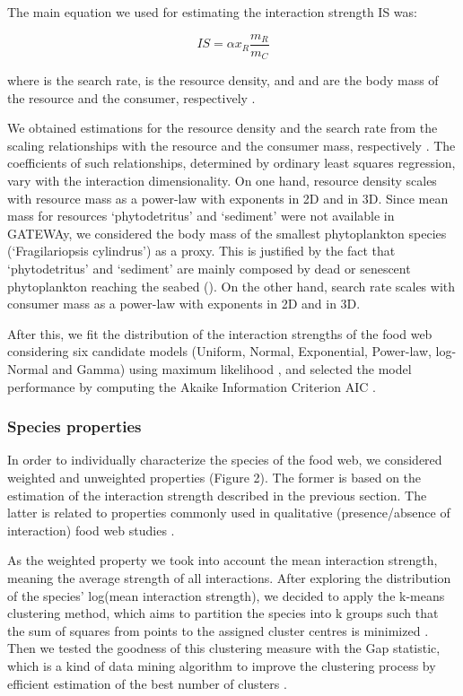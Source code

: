 \documentclass[gc, manuscript]{copernicus}
\begin{document}
The main equation we used for estimating the interaction strength IS
was:

\begin{equation}
IS = \alpha x_R \frac{m_R}{m_C}
\end{equation}

where \vec{\alpha} is the search rate,  is the resource
density, and  and  are the body mass of the resource
and the consumer, respectively \citep{Pawar2012}.

We obtained estimations for the resource density and the search rate
from the scaling relationships with the resource and the consumer mass,
respectively \citep{Pawar2012}. The coefficients of such relationships,
determined by ordinary least squares regression, vary with the
interaction dimensionality. On one hand, resource density scales with
resource mass as a power-law with exponents  in
2D and  in 3D. Since mean mass for resources
`phytodetritus' and `sediment' were not available in GATEWAy, we
considered the body mass of the smallest phytoplankton species
(`Fragilariopsis cylindrus') as a proxy. This is justified by the fact
that `phytodetritus' and `sediment' are mainly composed by dead or
senescent phytoplankton reaching the seabed (\citet{Wolanski2011}). On
the other hand, search rate scales with consumer mass as a power-law
with exponents  in 2D and 
in 3D.

After this, we fit the distribution of the interaction strengths of the
food web considering six candidate models (Uniform, Normal, Exponential,
Power-law, log-Normal and Gamma) using maximum likelihood
\citep{McCallum2008}, and selected the model performance by computing
the Akaike Information Criterion AIC \citep{Burnham2002}.

\subsubsection{Species properties}

In order to individually characterize the species of the food web, we
considered weighted and unweighted properties (Figure 2). The former is
based on the estimation of the interaction strength described in the
previous section. The latter is related to properties commonly used in
qualitative (presence/absence of interaction) food web studies
\citep{Martinez1991, Dunne2002, Borrelli2014}.

As the weighted property we took into account the mean interaction
strength, meaning the average strength of all interactions. After
exploring the distribution of the species' log(mean interaction
strength), we decided to apply the k-means clustering method, which aims
to partition the species into k groups such that the sum of squares from
points to the assigned cluster centres is minimized
\citep{Hartigan1979}. Then we tested the goodness of this clustering
measure with the Gap statistic, which is a kind of data mining algorithm
to improve the clustering process by efficient estimation of the best
number of clusters \citep{Tibshirani2001}.
\end{document}
